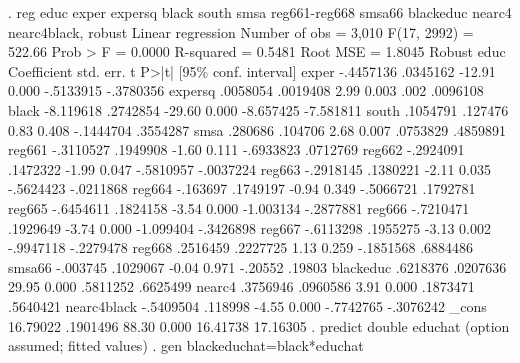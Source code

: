 . reg educ exper expersq black south smsa reg661-reg668 smsa66 blackeduc nearc4 nearc4black, robust
{\smallskip}
Linear regression                               Number of obs     =      3,010
                                                F(17, 2992)       =     522.66
                                                Prob > F          =     0.0000
                                                R-squared         =     0.5481
                                                Root MSE          =     1.8045
{\smallskip}
             {\VBAR}               Robust
        educ {\VBAR} Coefficient  std. err.      t    P>|t|     [95\% conf. interval]
       exper {\VBAR}  -.4457136   .0345162   -12.91   0.000    -.5133915   -.3780356
     expersq {\VBAR}   .0058054   .0019408     2.99   0.003         .002    .0096108
       black {\VBAR}  -8.119618   .2742854   -29.60   0.000    -8.657425   -7.581811
       south {\VBAR}   .1054791    .127476     0.83   0.408    -.1444704    .3554287
        smsa {\VBAR}    .280686    .104706     2.68   0.007     .0753829    .4859891
      reg661 {\VBAR}  -.3110527   .1949908    -1.60   0.111    -.6933823    .0712769
      reg662 {\VBAR}  -.2924091   .1472322    -1.99   0.047    -.5810957   -.0037224
      reg663 {\VBAR}  -.2918145   .1380221    -2.11   0.035    -.5624423   -.0211868
      reg664 {\VBAR}   -.163697   .1749197    -0.94   0.349    -.5066721    .1792781
      reg665 {\VBAR}  -.6454611   .1824158    -3.54   0.000    -1.003134   -.2877881
      reg666 {\VBAR}  -.7210471   .1929649    -3.74   0.000    -1.099404   -.3426898
      reg667 {\VBAR}  -.6113298   .1955275    -3.13   0.002    -.9947118   -.2279478
      reg668 {\VBAR}   .2516459   .2227725     1.13   0.259    -.1851568    .6884486
      smsa66 {\VBAR}   -.003745   .1029067    -0.04   0.971      -.20552      .19803
   blackeduc {\VBAR}   .6218376   .0207636    29.95   0.000     .5811252    .6625499
      nearc4 {\VBAR}   .3756946   .0960586     3.91   0.000     .1873471    .5640421
 nearc4black {\VBAR}  -.5409504    .118998    -4.55   0.000    -.7742765   -.3076242
       _cons {\VBAR}   16.79022   .1901496    88.30   0.000     16.41738    17.16305
{\smallskip}
. predict double educhat
(option {} assumed; fitted values)
{\smallskip}
. gen blackeduchat=black*educhat
{\smallskip}
